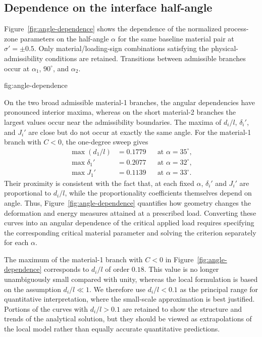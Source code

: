 \subsection{Dependence on the interface half-angle}
\label{subsec:figure3}

Figure~\ref{fig:angle-dependence} shows the dependence of the normalized
process-zone parameters on the half-angle $\alpha$ for the same baseline
material pair at $\sigma'=\pm0.5$. Only material/loading-sign
combinations satisfying the physical-admissibility conditions are
retained. Transitions between admissible branches occur at
$\alpha_1$, $90^\circ$, and $\alpha_2$.

%
{fig:angle-dependence}

On the two broad admissible material-1 branches, the angular dependencies
have pronounced interior maxima, whereas on the short material-2 branches
the largest values occur near the admissibility boundaries. The maxima of $d_i/l$, $\delta_i'$, and $J_i'$ are close but do not occur
at exactly the same angle. For the material-1 branch with $C<0$, the
one-degree sweep gives
\begin{equation*}
\begin{aligned}
  \max(d_1/l)&=0.1779 &&\text{at }\alpha=35^\circ,\\
  \max\delta_1'&=0.2077 &&\text{at }\alpha=32^\circ,\\
  \max J_1'&=0.1139 &&\text{at }\alpha=33^\circ.
\end{aligned}
\end{equation*}
Their proximity is consistent with the fact that, at each fixed $\alpha$,
$\delta_i'$ and $J_i'$ are proportional to $d_i/l$, while the
proportionality coefficients themselves depend on angle. Thus,
Figure~\ref{fig:angle-dependence} quantifies how geometry changes the
deformation and energy measures attained at a prescribed load. Converting
these curves into an angular dependence of the critical applied load requires
specifying the corresponding critical material parameter and solving the
criterion separately for each $\alpha$.

The maximum of the material-1 branch with $C<0$ in
Figure~\ref{fig:angle-dependence} corresponds to $d_i/l$ of order
$0.18$. This value is no longer unambiguously small compared with unity,
whereas the local formulation is based on the assumption
$d_i/l\ll1$. We therefore use $d_i/l<0.1$ as the principal range for
quantitative interpretation, where the small-scale approximation is best
justified. Portions of the curves with $d_i/l>0.1$ are retained to show
the structure and trends of the analytical solution, but they should be
viewed as extrapolations of the local model rather than equally accurate
quantitative predictions.

